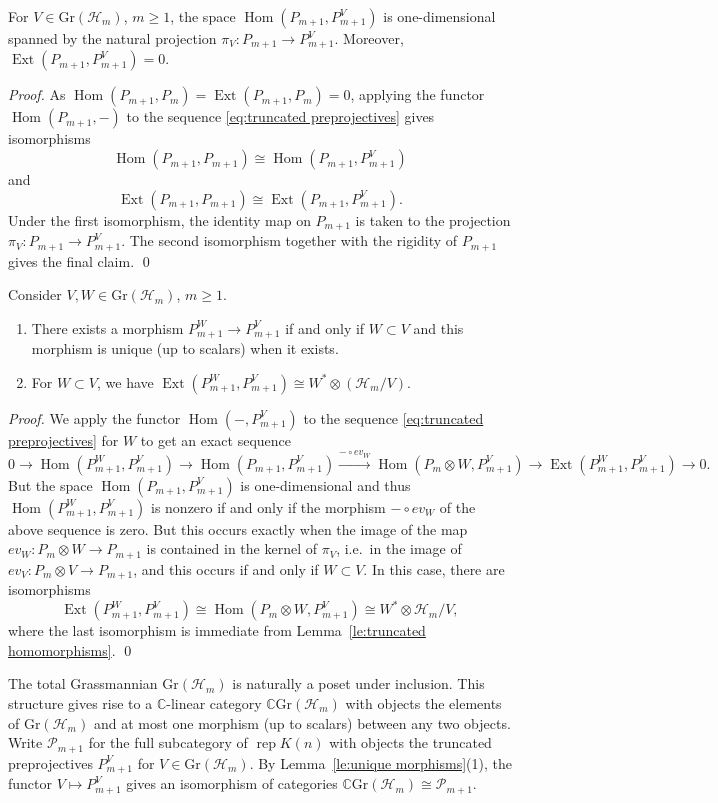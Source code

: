 \documentclass[smallextended,envcountsect,envcountsame]{svjour3}
\numberwithin{equation}{section}
\newcommand{\CC}{\mathbb{C}}
\newcommand{\cH}{\mathcal{H}}
\newcommand{\cP}{\mathcal{P}}
\newcommand{\Ext}{\operatorname{Ext}}
\newcommand{\Gr}{\mathrm{Gr}}
\newcommand{\Hom}{\operatorname{Hom}}
\newcommand{\rep}{\operatorname{rep}}
\begin{document}
\begin{lemma}
  \label{le:unique preprojective morphism}
  For $V\in \Gr(\cH_m)$, $m\ge1$, the space $\Hom(P_{m+1},P_{m+1}^V)$ is one-dimensional spanned by the natural projection $\pi_V:P_{m+1}\to P_{m+1}^V$.
  Moreover, $\Ext(P_{m+1},P_{m+1}^V)=0$.
\end{lemma}
\begin{proof}
 As $\Hom(P_{m+1},P_m)=\Ext(P_{m+1},P_m)=0$, applying the functor $\Hom(P_{m+1},-)$ to the sequence \eqref{eq:truncated preprojectives} gives isomorphisms 
  \[\Hom(P_{m+1},P_{m+1})\cong\Hom(P_{m+1},P_{m+1}^V)\]
  and 
  \[\Ext(P_{m+1},P_{m+1})\cong\Ext(P_{m+1},P_{m+1}^V).\]
  Under the first isomorphism, the identity map on $P_{m+1}$ is taken to the projection $\pi_V:P_{m+1}\to P_{m+1}^V$.
  The second isomorphism together with the rigidity of $P_{m+1}$ gives the final claim.
\qed\end{proof}

\begin{lemma}
  \label{le:unique morphisms}
  Consider $V,W\in \Gr(\cH_m)$, $m\ge1$.
  \begin{enumerate}
    \item There exists a morphism $P_{m+1}^W\to P_{m+1}^V$ if and only if $W\subset V$ and this morphism is unique (up to scalars) when it exists.
    \item For $W\subset V$, we have $\Ext(P_{m+1}^W,P_{m+1}^V)\cong W^*\otimes(\cH_m/V)$.
  \end{enumerate}
\end{lemma}
\begin{proof}
  We apply the functor $\Hom(-,P_{m+1}^V)$ to the sequence \eqref{eq:truncated preprojectives} for $W$ to get an exact sequence
  \[0\rightarrow \Hom(P_{m+1}^W,P_{m+1}^V)\longrightarrow \Hom(P_{m+1},P_{m+1}^V)\stackrel{-\circ ev_W}{\longrightarrow} \Hom(P_m\otimes W,P_{m+1}^V)\longrightarrow \Ext(P_{m+1}^W,P_{m+1}^V)\rightarrow 0.\]
  But the space $\Hom(P_{m+1},P_{m+1}^V)$ is one-dimensional and thus $\Hom(P_{m+1}^W,P_{m+1}^V)$ is nonzero if and only if the morphism $-\circ ev_W$ of the above sequence is zero.
  But this occurs exactly when the image of the map $ev_W:P_m\otimes W\to P_{m+1}$ is contained in the kernel of $\pi_V$, i.e.\ in the image of $ev_V:P_m\otimes V\to P_{m+1}$, and this occurs if and only if $W\subset V$. 
  In this case, there are isomorphisms
  \[\Ext(P_{m+1}^W,P_{m+1}^V)\cong\Hom(P_m\otimes W,P_{m+1}^V)\cong W^*\otimes \cH_m/V,\]
  where the last isomorphism is immediate from Lemma~\ref{le:truncated homomorphisms}.
\qed\end{proof}
\begin{remark}
  The total Grassmannian $\Gr(\cH_m)$ is naturally a poset under inclusion.
  This structure gives rise to a $\CC$-linear category $\CC \Gr(\cH_m)$ with objects the elements of $\Gr(\cH_m)$ and at most one morphism (up to scalars) between any two objects.
  Write $\cP_{m+1}$ for the full subcategory of $\rep K(n)$ with objects the truncated preprojectives $P_{m+1}^V$ for $V\in \Gr(\cH_m)$.
  By Lemma~\ref{le:unique morphisms}(1), the functor $V\mapsto P_{m+1}^V$ gives an isomorphism of categories $\CC \Gr(\cH_m)\cong\cP_{m+1}$.
\end{remark}
\end{document}
